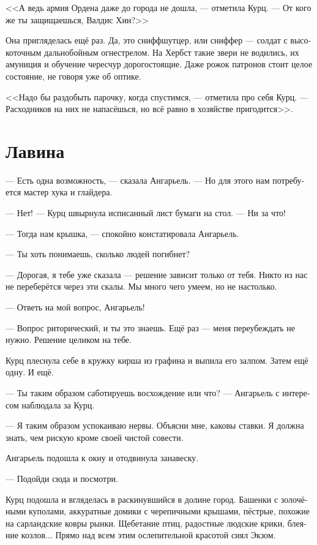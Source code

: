 \documentclass[a4paper,12pt,fleqn]{book}\usepackage{cooltooltips}\usepackage{polyglossia}\setdefaultlanguage[babelshorthands=true]{russian}\setotherlanguage{english}\defaultfontfeatures{Ligatures=TeX,Mapping=tex-text} \usepackage{xcolor}\definecolor{lightgray}{HTML}{bbbbbb}\color{lightgray}\newcommand{\ml}[3]{\textenglish{\textcolor{black}{#3}}}
\newcommand{\asterism}{\vspace{1em}{\centering\Large\bfseries$\ast~\ast~\ast$\par}\vspace{1em}}
\begin{document}
<<А ведь армия Ордена даже до города не дошла, --- отметила Курц.
--- От кого же ты защищаешься, Валдис Хин?>>

Она пригляделась ещё раз.
Да, это сниффшутцер, или сниффер --- солдат с высокоточным дальнобойным огнестрелом.
На Хербст такие звери не водились, их амуниция и обучение чересчур дорогостоящие.
Даже рожок патронов стоит целое состояние, не говоря уже об оптике.

<<Надо бы раздобыть парочку, когда спустимся, --- отметила про себя Курц.
--- Расходников на них не напасёшься, но всё равно в хозяйстве пригодится>>.

\section{Лавина}

--- Есть одна возможность, --- сказала Ангарьель.
--- Но для этого нам потребуется мастер хука и глайдера.

\asterism

--- Нет! --- Курц швырнула исписанный лист бумаги на стол.
--- Ни за что!

--- Тогда нам крышка, --- спокойно констатировала Ангарьель.

--- Ты хоть понимаешь, сколько людей погибнет?

--- Дорогая, я тебе уже сказала --- решение зависит только от тебя.
Никто из нас не переберётся через эти скалы.
Мы много чего умеем, но не настолько.

--- Ответь на мой вопрос, Ангарьель!

--- Вопрос риторический, и ты это знаешь.
Ещё раз --- меня переубеждать не нужно.
Решение целиком на тебе.

Курц плеснула себе в кружку кирша из графина и выпила его залпом.
Затем ещё одну.
И ещё.

--- Ты таким образом саботируешь восхождение или что? --- Ангарьель с интересом наблюдала за Курц.

--- Я таким образом успокаиваю нервы.
Объясни мне, каковы ставки.
Я должна знать, чем рискую кроме своей чистой совести.

Ангарьель подошла к окну и отодвинула занавеску.

--- Подойди сюда и посмотри.

Курц подошла и вгляделась в раскинувшийся в долине город.
Башенки с золочёными куполами, аккуратные домики с черепичными крышами, пёстрые, похожие на сарландские ковры рынки.
Щебетание птиц, радостные людские крики, блеяние козлов...
Прямо над всем этим ослепительной красотой сиял Экзом.
\end{document}

